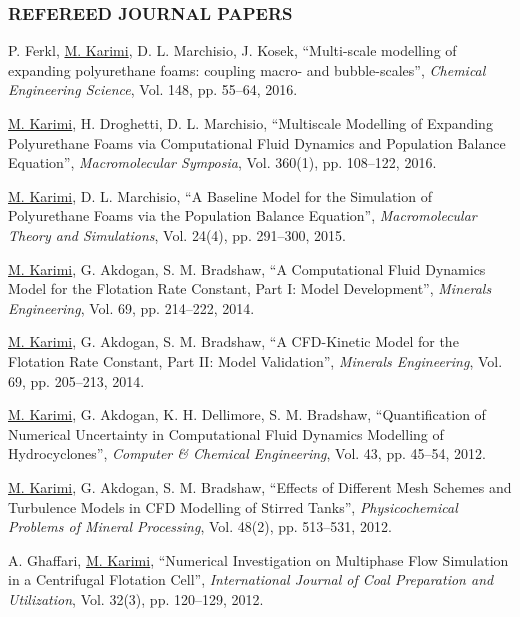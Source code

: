 \documentclass[10pt,a4]{article}
\newcounter{myEnumCounter}
\newcounter{mySaveCounter}
\renewenvironment{enumerate}{%
  \begin{list}{\arabic{myEnumCounter}.}{\usecounter{myEnumCounter}%
  \setcounter{myEnumCounter}{\value{mySaveCounter}}}
  }{%
  \setcounter{mySaveCounter}{\value{myEnumCounter}}\end{list}%
}
\newcommand{\quotes}[1]{``#1''}
\begin{document}
\begin{small}
\subsubsection*{REFEREED JOURNAL PAPERS}

\begin{enumerate}
	\item
P. Ferkl, \underline{M. Karimi}, D. L. Marchisio, J. Kosek, \quotes{Multi-scale modelling of expanding polyurethane foams: coupling macro- and bubble-scales}, \textit{Chemical Engineering Science}, Vol. 148, pp. 55--64, 2016.
	
    \item
\underline{M. Karimi}, H. Droghetti, D. L. Marchisio, \quotes{Multiscale Modelling of Expanding Polyurethane Foams via Computational Fluid Dynamics and Population Balance Equation},  \textit{Macromolecular Symposia}, Vol. 360(1), pp. 108--122, 2016.

	\item
\underline{M. Karimi}, D. L. Marchisio, \quotes{A Baseline Model for the Simulation of Polyurethane Foams via the Population Balance Equation}, \textit{Macromolecular Theory and Simulations}, Vol. 24(4), pp. 291--300, 2015.
	
	\item
\underline{M. Karimi}, G. Akdogan, S. M. Bradshaw, \quotes{A Computational Fluid Dynamics Model for the Flotation Rate Constant, Part I: Model Development}, \textit{Minerals Engineering}, Vol. 69, pp. 214--222, 2014.

	\item
\underline{M. Karimi}, G. Akdogan, S. M. Bradshaw, \quotes{A CFD-Kinetic Model for the Flotation Rate Constant, Part II: Model Validation}, \textit{Minerals Engineering}, Vol. 69, pp. 205--213, 2014.
	
	\item
\underline{M. Karimi}, G. Akdogan, K. H. Dellimore, S. M. Bradshaw, \quotes{Quantification of Numerical Uncertainty in Computational Fluid Dynamics Modelling of Hydrocyclones}, \textit{Computer \& Chemical Engineering}, Vol. 43, pp. 45--54, 2012. 

	\item 
\underline{M. Karimi}, G. Akdogan, S. M. Bradshaw, \quotes{Effects of Different Mesh Schemes and Turbulence Models in CFD Modelling of Stirred Tanks}, \textit{Physicochemical Problems of Mineral Processing}, Vol. 48(2), pp. 513--531, 2012.

	\item
A. Ghaffari, \underline{M. Karimi}, \quotes{Numerical Investigation on Multiphase Flow Simulation in a Centrifugal Flotation Cell}, \textit{International Journal of Coal Preparation and Utilization}, Vol. 32(3), pp. 120--129, 2012.


\end{enumerate}
\end{small}
\end{document}
